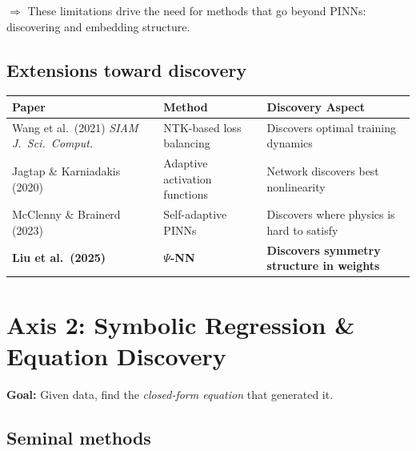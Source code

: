 \documentclass[11pt,a4paper]{article}
\begin{document}
$\Rightarrow$ These limitations drive the need for methods that go beyond PINNs: discovering and embedding structure.

\subsection{Extensions toward discovery}

\begin{center}
\renewcommand{\arraystretch}{1.25}
\begin{tabular}{@{}p{4cm} p{3.5cm} p{5.5cm}@{}}
\toprule
\textbf{Paper} & \textbf{Method} & \textbf{Discovery Aspect} \\
\midrule
Wang et al.\ (2021) \textit{SIAM J.\ Sci.\ Comput.} & NTK-based loss balancing & Discovers optimal training dynamics \\
Jagtap \& Karniadakis (2020) & Adaptive activation functions & Network discovers best nonlinearity \\
McClenny \& Brainerd (2023) & Self-adaptive PINNs & Discovers where physics is hard to satisfy \\
\textbf{Liu et al.\ (2025)} & \textbf{$\Psi$-NN} & \textbf{Discovers symmetry structure in weights} \\
\bottomrule
\end{tabular}
\end{center}

\section{Axis 2: Symbolic Regression \& Equation Discovery}

\textbf{Goal:} Given data, find the \emph{closed-form equation} that generated it.

\subsection{Seminal methods}
\end{document}
